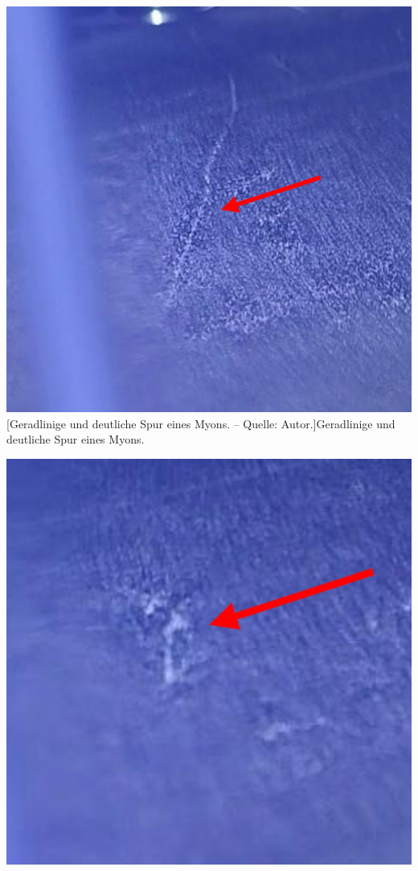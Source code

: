 \documentclass[a4paper,12pt]{article}
\begin{document}
\begin{table}
	\begin{minipage}[t]{0.31\textwidth}
	\includegraphics[width=\textwidth, valign=t]{Myon_scaled}
	[Geradlinige und deutliche Spur eines Myons. -- Quelle: Autor.]{Geradlinige und deutliche Spur eines Myons.}
	\label{fig:myon}
	\end{minipage} \hfill	
	\begin{minipage}[t]{0.31\textwidth}
	\includegraphics[width=\textwidth, valign=t]{Alpha_scaled}

\end{minipage}
\end{table}
\end{document}
